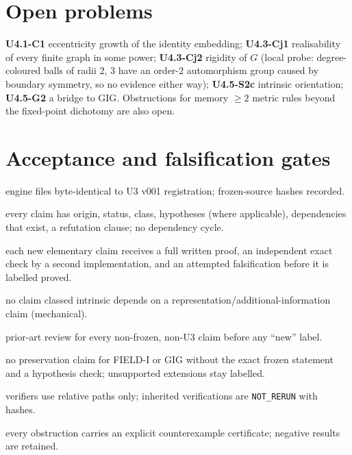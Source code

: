 \documentclass[11pt]{article}
\begin{document}
\section{Open problems}\label{sec:open}
\textbf{U4.1-C1} eccentricity growth of the identity embedding; \textbf{U4.3-Cj1} realisability of every finite graph in some power; \textbf{U4.3-Cj2} rigidity of $G$ (local probe: degree-coloured balls of radii 2, 3 have an order-2 automorphism group caused by boundary symmetry, so no evidence either way); \textbf{U4.5-S2c} intrinsic orientation; \textbf{U4.5-G2} a bridge to GIG. Obstructions for memory $\ge2$ metric rules beyond the fixed-point dichotomy are also open.

\section{Acceptance and falsification gates}\label{sec:gates}
\begin{description}\itemsep0pt
\item[AG0] engine files byte-identical to U3 v001 registration; frozen-source hashes recorded.
\item[AG1] every claim has origin, status, class, hypotheses (where applicable), dependencies that exist, a refutation clause; no dependency cycle.
\item[AG2] each new elementary claim receives a full written proof, an independent exact check by a second implementation, and an attempted falsification before it is labelled proved.
\item[AG3] no claim classed intrinsic depends on a representation/additional-information claim (mechanical).
\item[AG4] prior-art review for every non-frozen, non-U3 claim before any ``new'' label.
\item[AG5] no preservation claim for FIELD-I or GIG without the exact frozen statement and a hypothesis check; unsupported extensions stay labelled.
\item[AG6] verifiers use relative paths only; inherited verifications are \texttt{NOT\_RERUN} with hashes.
\item[AG7] every obstruction carries an explicit counterexample certificate; negative results are retained.
\end{description}
\end{document}
